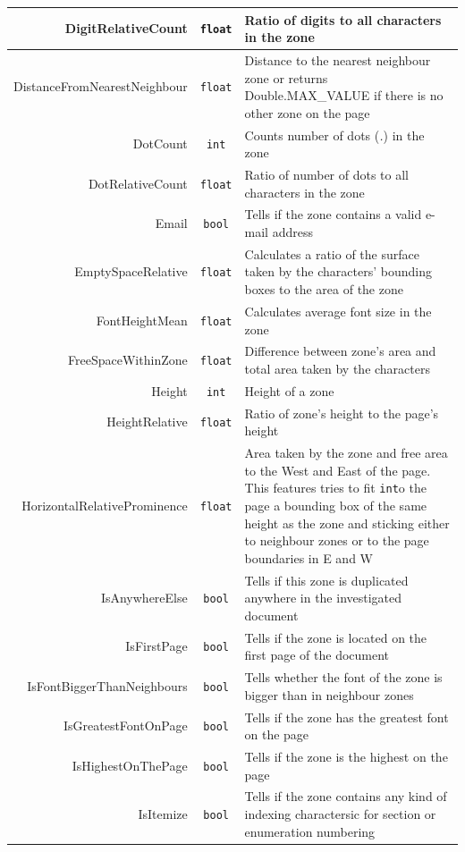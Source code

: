 \begin{appendix}
\begin{longtable}[c]{|r|c|p{8cm}|}
DigitRelativeCount & \verb+float+ & Ratio of digits to all characters in the zone \\ \hline
DistanceFromNearestNeighbour & \verb+float+ & Distance to the nearest neighbour zone or returns Double.MAX\_VALUE if there is no other zone on the page\\ \hline
DotCount & \verb+int+ & Counts number of dots (\textit{.}) in the zone\\ \hline
DotRelativeCount & \verb+float+ & Ratio of number of dots to all characters in the zone \\ \hline
Email & \verb+bool+ & Tells if the zone contains a valid e-mail address\\ \hline
EmptySpaceRelative & \verb+float+ & Calculates a ratio of the surface taken by the characters' bounding boxes to the area of the zone \\ \hline
FontHeightMean & \verb+float+ & Calculates average font size in the zone \\ \hline
FreeSpaceWithinZone & \verb+float+ & Difference between zone's area and total area taken by the characters\\ \hline
Height & \verb+int+ & Height of a zone\\ \hline
HeightRelative & \verb+float+ & Ratio of zone's height to the page's height\\ \hline
HorizontalRelativeProminence & \verb+float+ & Area taken by the zone and free area to the West and East of the page. This features tries to fit \verb+int+o the page a bounding box of the same height as the zone and sticking either to neighbour zones or to the page boundaries in E and W\\ \hline
IsAnywhereElse & \verb+bool+ & Tells if this zone is duplicated anywhere in the investigated document \\ \hline
IsFirstPage & \verb+bool+ & Tells if the zone is located on the first page of the document \\ \hline
IsFontBiggerThanNeighbours & \verb+bool+ & Tells whether the font of the zone is bigger than in neighbour zones\\ \hline
IsGreatestFontOnPage & \verb+bool+ & Tells if the zone has the greatest font on the page \\ \hline
IsHighestOnThePage & \verb+bool+ & Tells if the zone is the highest on the page \\ \hline
IsItemize & \verb+bool+ & Tells if the zone contains any kind of indexing charactersic for section or enumeration numbering \\ \hline

\end{longtable}
\end{appendix}

